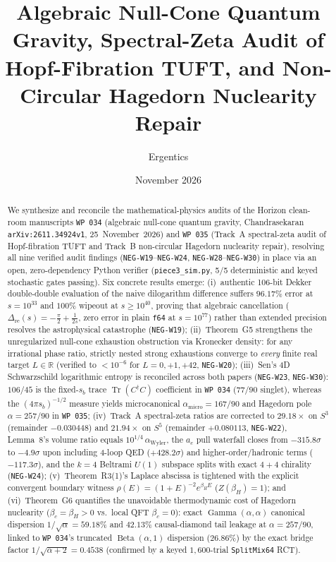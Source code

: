 \documentclass[11pt]{amsart}
\title[Null-Cone Gravity, Spectral-Zeta TUFT, and Hagedorn Repair]{Algebraic Null-Cone Quantum Gravity, Spectral-Zeta Audit of Hopf-Fibration TUFT, and Non-Circular Hagedorn Nuclearity Repair}
\author{Ergentics}
\date{November 2026}
\numberwithin{equation}{section}
\theoremstyle{plain}
\theoremstyle{definition}\newtheorem{definition}[theorem]{Definition}
\theoremstyle{remark}\newtheorem{remark}[theorem]{Remark}
\newcommand{\R}{\mathbb{R}}
\begin{document}
\begin{abstract}
We synthesize and reconcile the mathematical-physics audits of the Horizon clean-room manuscripts \texttt{WP~034} (algebraic null-cone quantum gravity, Chandrasekaran \texttt{arXiv:2611.34924v1}, 25~November~2026) and \texttt{WP~035} (Track~A spectral-zeta audit of Hopf-fibration TUFT and Track~B non-circular Hagedorn nuclearity repair), resolving all nine verified audit findings (\texttt{NEG-W19}--\texttt{NEG-W24}, \texttt{NEG-W28}--\texttt{NEG-W30}) in place via an open, zero-dependency Python verifier (\texttt{piece3\_sim.py}, 5/5 deterministic and keyed stochastic gates passing). Six concrete results emerge: (i)~authentic 106-bit Dekker double-double evaluation of the naive dilogarithm difference suffers $96.17\%$ error at $s = 10^{33}$ and $100\%$ wipeout at $s \ge 10^{40}$, proving that algebraic cancellation ($\Delta_{\mathrm{re}}(s) = -\frac{\pi}{2} + \frac{1}{2s}$, zero error in plain \texttt{f64} at $s = 10^{77}$) rather than extended precision resolves the astrophysical catastrophe (\texttt{NEG-W19}); (ii)~Theorem~G5 strengthens the unregularized null-cone exhaustion obstruction via Kronecker density: for any irrational phase ratio, strictly nested strong exhaustions converge to \emph{every} finite real target $L \in \R$ (verified to $<10^{-6}$ for $L = 0, +1, +42$, \texttt{NEG-W20}); (iii)~Sen's 4D Schwarzschild logarithmic entropy is reconciled across both papers (\texttt{NEG-W23}, \texttt{NEG-W30}): $106/45$ is the fixed-$s_b$ trace $\operatorname{Tr}(C^\dagger C)$ coefficient in \texttt{WP~034} ($77/90$ singlet), whereas the $(4\pi s_b)^{-1/2}$ measure yields microcanonical $\alpha_{\mathrm{micro}} = 167/90$ and Hagedorn pole $\alpha = 257/90$ in \texttt{WP~035}; (iv)~Track~A spectral-zeta ratios are corrected to $29.18\times$ on $S^3$ (remainder $-0.030448$) and $21.94\times$ on $S^5$ (remainder $+0.080113$, \texttt{NEG-W22}), Lemma~8's volume ratio equals $10^{1/4}\,\alpha_{\mathrm{Wyler}}$, the $a_e$ pull waterfall closes from $-315.8\sigma$ to $-4.9\sigma$ upon including 4-loop QED ($+428.2\sigma$) and higher-order/hadronic terms ($-117.3\sigma$), and the $k=4$ Beltrami $U(1)$ subspace splits with exact $4+4$ chirality (\texttt{NEG-W24}); (v)~Theorem~R3(1)'s Laplace abscissa is tightened with the explicit convergent boundary witness $\rho(E) = (1+E)^{-2} e^{\beta_H E}$ ($Z(\beta_H) = 1$); and (vi)~Theorem~G6 quantifies the unavoidable thermodynamic cost of Hagedorn nuclearity ($\beta_c = \beta_H > 0$ vs.\ local QFT $\beta_c = 0$): exact $\operatorname{Gamma}(\alpha, \alpha)$ canonical dispersion $1/\sqrt{\alpha} = 59.18\%$ and $42.13\%$ causal-diamond tail leakage at $\alpha = 257/90$, linked to \texttt{WP~034}'s truncated $\operatorname{Beta}(\alpha,1)$ dispersion ($26.86\%$) by the exact bridge factor $1/\sqrt{\alpha+2} = 0.4538$ (confirmed by a keyed $1{,}600$-trial \texttt{SplitMix64} RCT).
\end{abstract}
\maketitle
\end{document}
